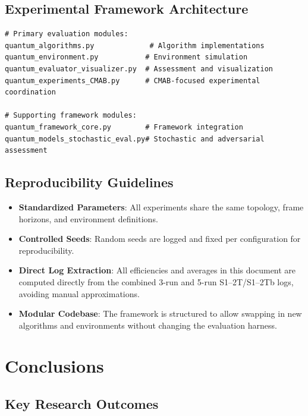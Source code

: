 \documentclass[12pt,a4paper]{article}
\begin{document}
\subsection{Experimental Framework Architecture}

\begin{lstlisting}[caption=Core Framework Components]
# Primary evaluation modules:
quantum_algorithms.py             # Algorithm implementations
quantum_environment.py           # Environment simulation
quantum_evaluator_visualizer.py  # Assessment and visualization
quantum_experiments_CMAB.py      # CMAB-focused experimental coordination

# Supporting framework modules:
quantum_framework_core.py        # Framework integration
quantum_models_stochastic_eval.py# Stochastic and adversarial assessment
\end{lstlisting}

\subsection{Reproducibility Guidelines}

\begin{itemize}
\item \textbf{Standardized Parameters}: All experiments share the same topology, frame horizons, and environment definitions.
\item \textbf{Controlled Seeds}: Random seeds are logged and fixed per configuration for reproducibility.
\item \textbf{Direct Log Extraction}: All efficiencies and averages in this document are computed directly from the combined 3-run and 5-run S1–2T/S1–2Tb logs, avoiding manual approximations.
\item \textbf{Modular Codebase}: The framework is structured to allow swapping in new algorithms and environments without changing the evaluation harness.
\end{itemize}

\newpage
\section{Conclusions}

\subsection{Key Research Outcomes}
\end{document}
